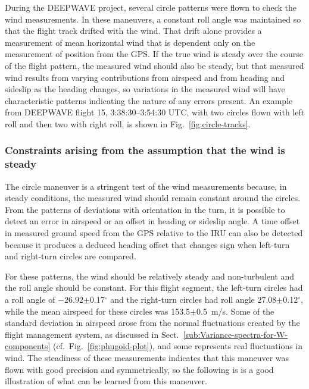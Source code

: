 \documentclass[12pt,twoside,english]{article}\usepackage[]{graphicx}\usepackage[]{color}
\let\OrgIndex\index
\renewcommand*{\index}[1]{\OrgIndex{#1}}
\begin{document}
{{
During the DEEPWAVE project, several circle patterns were flown to check the wind measurements. In these maneuvers, a constant roll angle was maintained so that the flight track drifted with the wind. That drift alone provides a measurement of mean horizontal wind that is dependent only on the measurement of position from the GPS. If the true wind is steady over the course of the flight pattern, the measured wind should also be steady, but that measured wind results from varying contributions from airspeed and from heading and sideslip as the heading changes, so variations in the measured wind will have characteristic patterns indicating the nature of any errors present. An example from DEEPWAVE flight 15, 3:38:30--3:54:30 UTC, with two circles flown with left roll and then two with right roll, is shown in Fig.~\ref{fig:circle-tracks}. 
% 

\subsubsection{Constraints arising from the assumption that the wind is steady}

The circle maneuver is a stringent test of the wind measurements because, in steady conditions, the measured wind should remain constant around the circles. From the patterns of deviations with orientation in the turn, it is possible to detect an error in airspeed or an offset in heading or sideslip angle. A time offset in measured ground speed from the GPS relative to the IRU can also be detected because it produces a deduced heading offset that changes sign when left-turn and right-turn circles are compared. 

For these patterns, the wind should be relatively steady and non-turbulent and the roll angle should be constant. For this flight segment, the left-turn circles had a roll angle of \ensuremath{-26.92}$\pm$0.17$^{\circ}$ and the right-turn circles had roll angle 27.08$\pm$0.12$^{\circ}$, while the mean airspeed for these circles was 153.5$\pm$0.5~m/s. Some of the standard deviation in airspeed arose from the normal fluctuations created by the flight management system, as discussed in Sect.~\ref{sub:Variance-spectra-for-W-components} (cf.~Fig.~\ref{fig:phugoid-plot}), and some represents real fluctuations in wind. The steadiness of these measurements indicates that this maneuver was flown with good precision and symmetrically, so the following is is a good illustration of what can be learned from this maneuver. 

}}
\end{document}
